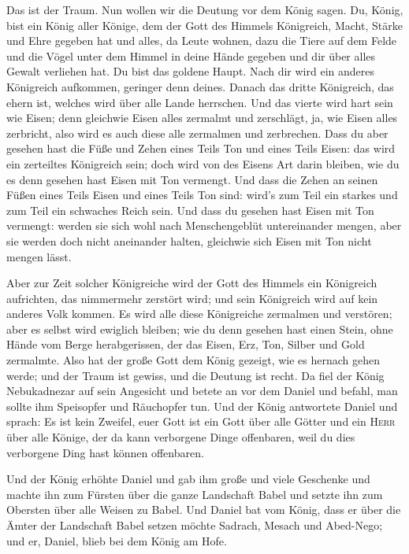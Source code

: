  Das ist der Traum. Nun wollen wir die Deutung vor dem
König sagen.  Du, König, bist ein König aller Könige, dem
der Gott des Himmels Königreich, Macht, Stärke und Ehre gegeben hat
 und alles, da Leute wohnen, dazu die Tiere auf dem Felde
und die Vögel unter dem Himmel in deine Hände gegeben und dir über alles
Gewalt verliehen hat. Du bist das goldene Haupt.  Nach
dir wird ein anderes Königreich aufkommen, geringer denn deines. Danach
das dritte Königreich, das ehern ist, welches wird über alle Lande
herrschen.  Und das vierte wird hart sein wie Eisen; denn
gleichwie Eisen alles zermalmt und zerschlägt, ja, wie Eisen alles
zerbricht, also wird es auch diese alle zermalmen und zerbrechen.
 Dass du aber gesehen hast die Füße und Zehen eines Teils
Ton und eines Teils Eisen: das wird ein zerteiltes Königreich sein; doch
wird von des Eisens Art darin bleiben, wie du es denn gesehen hast Eisen
mit Ton vermengt.  Und dass die Zehen an seinen Füßen
eines Teils Eisen und eines Teils Ton sind: wird's zum Teil ein starkes
und zum Teil ein schwaches Reich sein.  Und dass du
gesehen hast Eisen mit Ton vermengt: werden sie sich wohl nach
Menschengeblüt untereinander mengen, aber sie werden doch nicht
aneinander halten, gleichwie sich Eisen mit Ton nicht mengen lässt.

 Aber zur Zeit solcher Königreiche wird der Gott des
Himmels ein Königreich aufrichten, das nimmermehr zerstört wird; und
sein Königreich wird auf kein anderes Volk kommen. Es wird alle diese
Königreiche zermalmen und verstören; aber es selbst wird ewiglich
bleiben;  wie du denn gesehen hast einen Stein, ohne
Hände vom Berge herabgerissen, der das Eisen, Erz, Ton, Silber und Gold
zermalmte. Also hat der große Gott dem König gezeigt, wie es hernach
gehen werde; und der Traum ist gewiss, und die Deutung ist recht.
 Da fiel der König Nebukadnezar auf sein Angesicht und
betete an vor dem Daniel und befahl, man sollte ihm Speisopfer und
Räuchopfer tun.  Und der König antwortete Daniel und
sprach: Es ist kein Zweifel, euer Gott ist ein Gott über alle Götter und
ein \textsc{Herr} über alle Könige, der da kann verborgene Dinge
offenbaren, weil du dies verborgene Ding hast können offenbaren.

 Und der König erhöhte Daniel und gab ihm große und viele
Geschenke und machte ihn zum Fürsten über die ganze Landschaft Babel und
setzte ihn zum Obersten über alle Weisen zu Babel.  Und
Daniel bat vom König, dass er über die Ämter der Landschaft Babel setzen
möchte Sadrach, Mesach und Abed-Nego; und er, Daniel, blieb bei dem
König am Hofe.

